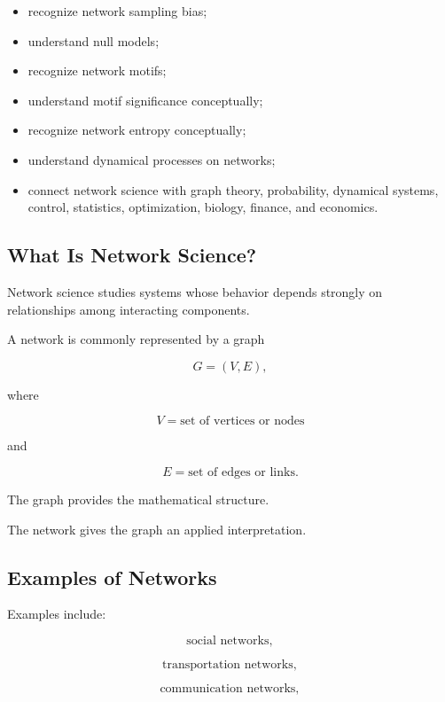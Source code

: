 {\begin{itemize}
    \item recognize network sampling bias;
    \item understand null models;
    \item recognize network motifs;
    \item understand motif significance conceptually;
    \item recognize network entropy conceptually;
    \item understand dynamical processes on networks;
    \item connect network science with graph theory, probability,
          dynamical systems, control, statistics, optimization,
          biology, finance, and economics.
\end{itemize}
}

\subsection{What Is Network Science?}
\label{subsec:what-is-network-science}

Network science studies systems whose behavior depends strongly on
relationships among interacting components.

A network is commonly represented by a graph

\[
\boxed{
G=(V,E),
}
\]

where

\[
V
=
\text{set of vertices or nodes}
\]

and

\[
E
=
\text{set of edges or links}.
\]

The graph provides the mathematical structure.

The network gives the graph an applied interpretation.

\subsection{Examples of Networks}
\label{subsec:network-examples}

Examples include:

\[
\boxed{
\text{social networks},
}
\]

\[
\boxed{
\text{transportation networks},
}
\]

\[
\boxed{
\text{communication networks},
}
\]

